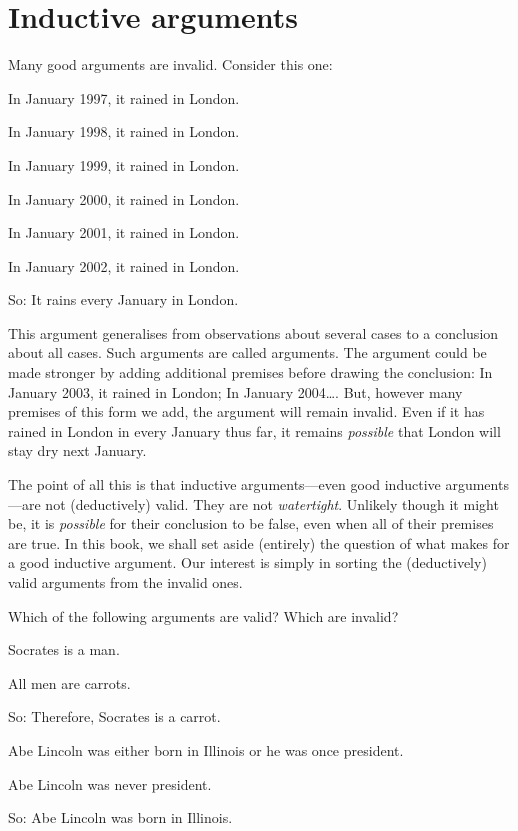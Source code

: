 \section{Inductive arguments}
Many good arguments are invalid. Consider this one:
	\begin{earg}
		\item[] In January 1997, it rained in London.
		\item[] In January 1998, it rained in London.
		\item[] In January 1999, it rained in London.
		\item[] In January 2000, it rained in London.
		\item[] In January 2001, it rained in London.
		\item[] In January 2002, it rained in London.
	\item[So:] It rains every January in London.
\end{earg}
This argument generalises from observations about several cases to a conclusion about all cases. Such arguments are called  arguments. The argument could be made stronger by adding additional premises before drawing the conclusion: In January 2003, it rained in London; In January 2004\ldots. But, however many premises of this form we add, the argument will remain invalid. Even if it has rained in London in every January thus far, it remains \emph{possible} that London will stay dry next January.

The point of all this is that inductive arguments---even good inductive arguments---are not (deductively) valid. They are not \emph{watertight}. Unlikely though it might be, it is \emph{possible} for their conclusion to be false, even when all of their premises are true. In this book, we shall set aside (entirely) the question of what makes for a good inductive argument. Our interest is simply in sorting the (deductively) valid arguments from the invalid ones.  


\practiceproblems
\problempart
Which of the following arguments are valid? Which are invalid?

\begin{earg}
\item Socrates is a man.
\item All men are carrots.
\item[So:] Therefore, Socrates is a carrot.
\end{earg}

\begin{earg}
\item Abe Lincoln was either born in Illinois or he was once president.
\item Abe Lincoln was never president.
\item[So:] Abe Lincoln was born in Illinois.
\end{earg}

